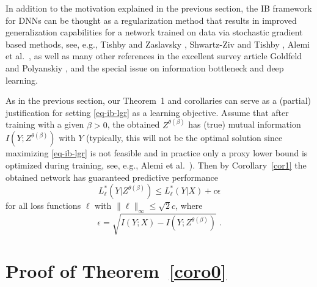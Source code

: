 \documentclass[11pt]{article}
\begin{document}
In addition to the motivation  explained in the previous section, the IB framework for  DNNs can be thought as a regularization method that results in improved generalization capabilities for a network trained on data via stochastic gradient based methods, see, e.g.,  
Tishby and Zaslavsky \cite{TiZa15}, 
Shwartz-Ziv and Tishby \cite{ScTi17}, 
Alemi et al.~\cite{AlFiDiMu17}, as well as many other references in the excellent survey article 
Goldfeld and Polyanskiy \cite{GoPo20}, and the special issue \cite{GeKu20} on information bottleneck and deep learning. 

 As in the previous section, our Theorem~1 and corollaries can serve as a (partial) justification for setting \eqref{eq-ib-lgr} as a learning objective. Assume that after training with a given $\beta>0$,  the obtained $Z^{\theta(\beta)}$ has (true)  mutual information $I(Y;Z^{\theta(\beta)})$ with $Y$ (typically,  this will not be the optimal solution since maximizing \eqref{eq-ib-lgr} is not feasible and in practice only a proxy lower bound is optimized during training, see, e.g.,  Alemi et al.~\cite{AlFiDiMu17}). Then by Corollary~\ref{cor1} the obtained network has guaranteed predictive performance 
 \[
 L_\ell^*(Y|Z^{\theta(\beta)}) \le   L_\ell^*(Y|X) +  c\epsilon  
\]
for all loss functions $\ell$ with   $\|\ell\|_{\infty}\le \sqrt{2} c$, where 
\[
\epsilon = \sqrt{ I(Y;X)- I(Y;Z^{\theta(\beta)})}\;. 
\]

\section{Proof of Theorem~\ref{coro0}}

\label{sec-proof}
\end{document}
